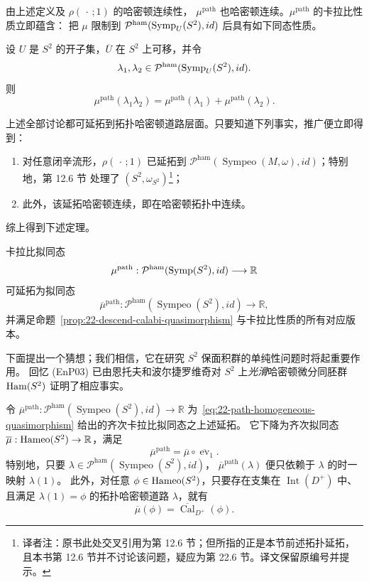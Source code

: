 由上述定义及 $\rho(\,\cdot\,;1)$ 的哈密顿连续性，
$\mu^{\mathrm{path}}$ 也哈密顿连续。$\mu^{\mathrm{path}}$ 的卡拉比性质立即蕴含：
把 $\mu$ 限制到
$\mathcal P^{\mathrm{ham}}(\operatorname{Symp}_U(S^2),id)$ 后具有如下同态性质。

\begin{corollary}
\label{cor:22-local-path-calabi-homomorphism}
设 $U$ 是 $S^2$ 的开子集，$\overline U$ 在 $S^2$ 上可移，并令
\[
 \lambda_1,\lambda_2\in\mathcal P^{\mathrm{ham}}(\operatorname{Symp}_U(S^2),id).
\]
则
\[
 \mu^{\mathrm{path}}(\lambda_1\lambda_2)
 =\mu^{\mathrm{path}}(\lambda_1)+\mu^{\mathrm{path}}(\lambda_2).
\]
\end{corollary}

上述全部讨论都可延拓到拓扑哈密顿道路层面。只要知道下列事实，推广便立即得到：
\begin{enumerate}[label=(\arabic*)]
\item 对任意闭辛流形，$\rho(\,\cdot\,;1)$ 已延拓到
$\mathcal P^{\mathrm{ham}}(\operatorname{Sympeo}(M,\omega),id)$；特别地，第 12.6 节
处理了 $(S^2,\omega_{S^2})$\footnote{译者注：原书此处交叉引用为第 12.6 节；但所指的正是本节前述拓扑延拓，
且本书第 12.6 节并不讨论该问题，疑应为第 22.6 节。译文保留原编号并提示。}；
\item 此外，该延拓哈密顿连续，即在哈密顿拓扑中连续。
\end{enumerate}
综上得到下述定理。

\begin{theorem}
\label{thm:22-topological-calabi-quasimorphism}
卡拉比拟同态
\[
 \mu^{\mathrm{path}}:
 \mathcal P^{\mathrm{ham}}(\operatorname{Symp}(S^2),id)\longrightarrow\mathbb R
\]
可延拓为拟同态
\[
 \overline\mu^{\mathrm{path}}:
 \mathcal P^{\mathrm{ham}}(\operatorname{Sympeo}(S^2),id)
 \longrightarrow\mathbb R,
\]
并满足命题~\ref{prop:22-descend-calabi-quasimorphism} 与卡拉比性质的所有对应版本。
\end{theorem}

下面提出一个猜想；我们相信，它在研究 $S^2$ 保面积群的单纯性问题时将起重要作用。
回忆 (EnP03) 已由恩托夫和波尔捷罗维奇对 $S^2$ 上\emph{光滑}哈密顿微分同胚群
$\operatorname{Ham}(S^2)$ 证明了相应事实。

\begin{conjecture}
\label{conj:22-descend-topological-calabi}
令
$\overline\mu^{\mathrm{path}}:
\mathcal P^{\mathrm{ham}}(\operatorname{Sympeo}(S^2),id)\to\mathbb R$
为~\eqref{eq:22-path-homogeneous-quasimorphism} 给出的齐次卡拉比拟同态之上述延拓。
它下降为齐次拟同态
$\overline\mu:\operatorname{Hameo}(S^2)\to\mathbb R$，满足
\begin{equation}
 \overline\mu^{\mathrm{path}}
 =\overline\mu\circ\overline{\operatorname{ev}}_1.
 \label{eq:22-topological-calabi-descent}
\end{equation}
特别地，只要
$\lambda\in\mathcal P^{\mathrm{ham}}(\operatorname{Sympeo}(S^2),id)$，
$\overline\mu^{\mathrm{path}}(\lambda)$ 便只依赖于 $\lambda$ 的时一映射 $\lambda(1)$。
此外，对任意 $\phi\in\operatorname{Hameo}(S^2)$，只要存在支集在 $\operatorname{Int}(D^+)$ 中、
且满足 $\lambda(1)=\phi$ 的拓扑哈密顿道路 $\lambda$，就有
\begin{equation}
 \overline\mu(\phi)=\overline{\operatorname{Cal}}_{D^+}(\phi).
 \label{eq:22-topological-calabi-property}
\end{equation}
\end{conjecture}

